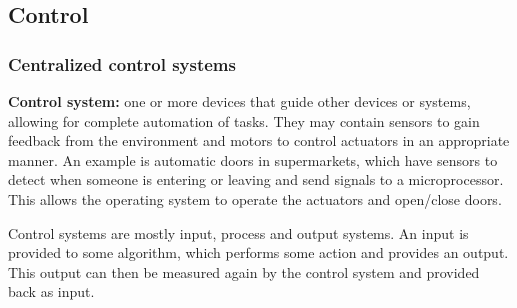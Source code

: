 \documentclass{article}
\begin{document}
\subsection{Control}

\subsubsection{Centralized control systems}

\textbf{Control system:} one or more devices that guide other devices or
systems, allowing for complete automation of tasks. They may contain sensors
to gain feedback from the environment and motors to control actuators in an
appropriate manner. An example is automatic doors in supermarkets, which have
sensors to detect when someone is entering or leaving and send signals to a
microprocessor. This allows the operating system to operate the actuators and
open/close doors.

Control systems are mostly input, process and output systems. An input is
provided to some algorithm, which performs some action and provides an output.
This output can then be measured again by the control system and provided back
as input.
\end{document}
